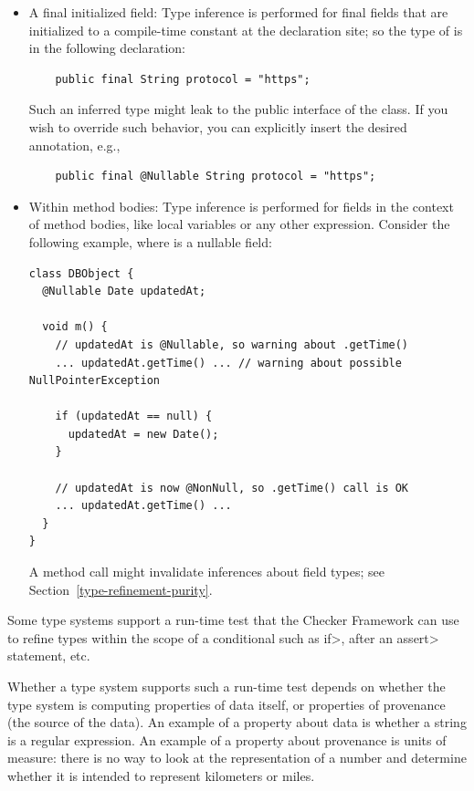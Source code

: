 \begin{itemize}

\item
A final initialized field:
Type inference is performed for final fields that are initialized to a
compile-time constant at the declaration site; so the type of 
is  in the following declaration:

\begin{Verbatim}
    public final String protocol = "https";
\end{Verbatim}

Such an inferred type might leak to the public interface of the class.
If you wish to override such behavior, you can explicitly insert the desired
annotation, e.g.,

\begin{Verbatim}
    public final @Nullable String protocol = "https";
\end{Verbatim}

\item
Within method bodies:
Type inference is performed for fields in the context of method bodies,
like local variables or any other expression.
Consider the following example, where  is a nullable
field:

\begin{Verbatim}
class DBObject {
  @Nullable Date updatedAt;

  void m() {
    // updatedAt is @Nullable, so warning about .getTime()
    ... updatedAt.getTime() ... // warning about possible NullPointerException

    if (updatedAt == null) {
      updatedAt = new Date();
    }

    // updatedAt is now @NonNull, so .getTime() call is OK
    ... updatedAt.getTime() ...
  }
}
\end{Verbatim}

A method call might invalidate inferences about field types; see
Section~\ref{type-refinement-purity}.

\end{itemize}



Some type systems support a run-time test that the Checker Framework can
use to refine types within the scope of a conditional such as \<if>, after
an \<assert> statement, etc.

Whether a type system supports such a run-time test depends on whether the
type system is computing properties of data itself, or properties of
provenance (the source of the data).  An example of a property about data is
whether a string is a regular expression.  An example of a property about
provenance is units of measure:  there is no way to look at the
representation of a number and determine whether it is intended to
represent kilometers or miles.

